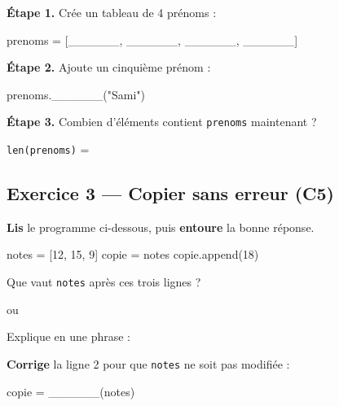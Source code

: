 \textbf{Étape 1.} Crée un tableau de 4 prénoms :

\begin{python}
prenoms = [______, ______, ______, ______]
\end{python}

\textbf{Étape 2.} Ajoute un cinquième prénom :

\begin{python}
prenoms.______("Sami")
\end{python}

\textbf{Étape 3.} Combien d'éléments contient \lstinline{prenoms} maintenant ?

\medskip
\lstinline{len(prenoms)} = \dotfill

\bigskip
\bigskip

\subsection*{Exercice 3 --- Copier sans erreur (C5)}

\textbf{Lis} le programme ci-dessous, puis \textbf{entoure} la bonne réponse.

\begin{python}
notes = [12, 15, 9]
copie = notes
copie.append(18)
\end{python}

\bigskip

Que vaut \lstinline{notes} après ces trois lignes ?

\bigskip

\begin{center}
\fbox{\lstinline{[12, 15, 9]}} \qquad ou \qquad
\fbox{\lstinline{[12, 15, 9, 18]}}
\end{center}

\bigskip

Explique en une phrase : \dotfill

\medskip
\dotfill

\bigskip

\textbf{Corrige} la ligne 2 pour que \lstinline{notes} ne soit pas modifiée :

\begin{python}
copie = ______(notes)
\end{python}
